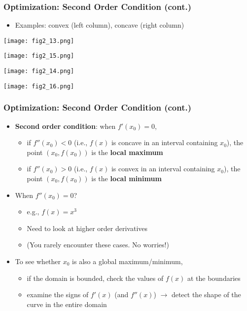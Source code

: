 \documentclass[pdflatex, 12pt]{beamer}
\begin{document}
\begin{frame}
\frametitle{Optimization: Second Order Condition (cont.)}
\begin{itemize}
\item Examples: convex (left column), concave (right column)
\end{itemize}
\begin{minipage}{0.49\textwidth}
\centering
\texttt{[image: fig2\_13.png]}
\end{minipage}
\begin{minipage}{0.49\textwidth}
\centering
\texttt{[image: fig2\_15.png]}
\end{minipage}
\begin{minipage}{0.49\textwidth}
\vspace{0.4cm}
\centering
\texttt{[image: fig2\_14.png]}
\end{minipage}
\begin{minipage}{0.49\textwidth}
\vspace{0.4cm}
\centering
\texttt{[image: fig2\_16.png]}
\end{minipage}
\end{frame}

\begin{frame}
\frametitle{Optimization: Second Order Condition (cont.)}
\begin{itemize}
\item \textbf{Second order condition}: when $f'(x_0) = 0$,
 \begin{itemize}
 \item if $f''(x_0) < 0$ (i.e., $f(x)$ is concave in an interval containing $x_0$), the point $(x_0, f(x_0))$ is the \textbf{local maximum}
 \item if $f''(x_0) > 0$ (i.e., $f(x)$ is convex in an interval containing $x_0$), the point $(x_0, f(x_0))$ is the \textbf{local minimum}
 \end{itemize}
\vspace{0.4cm}
\item When $f''(x_0) = 0$?
 \begin{itemize}
 \item e.g., $f(x) = x^3$
 \item Need to look at higher order derivatives
 \item (You rarely encounter these cases. No worries!)
 \end{itemize}
\vspace{0.4cm}
\item To see whether $x_0$ is also a global maximum/minimum,
 \begin{itemize}
 \item if the domain is bounded, check the values of $f(x)$ at the boundaries
 \item examine the signs of $f'(x)$ (and $f''(x)$) $\rightarrow$ detect the shape of the curve in the entire domain
 \end{itemize}
\end{itemize}
\end{frame}
\end{document}
